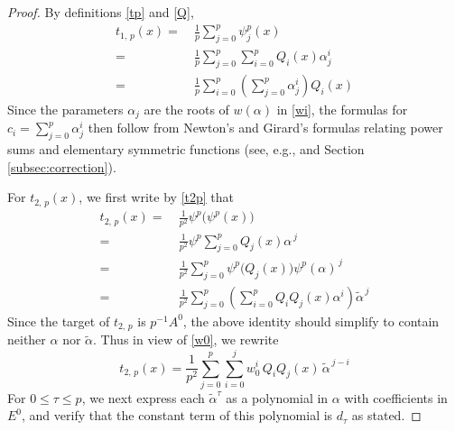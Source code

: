 \documentclass{gtpart}
\theoremstyle{definition}
\theoremstyle{remark}
\newcommand{\A}{\alpha}
\newcommand{\T}{\tau}
\renewcommand{\=}{\approx}
\renewcommand{\-}{\sim}
\numberwithin{equation}{section}
\begin{document}
\begin{proof}
 By definitions \eqref{tp} and \eqref{Q}, 
 \begin{equation*}
  \begin{split}
   t_{1,\,p}(x) = & ~ \frac{1}{p} \sum_{j = 0}^p \psi^p_j(x) \\
                = & ~ \frac{1}{p} \sum_{j = 0}^p \sum_{i = 0}^p Q_i(x) \A_j^i \\
                = & ~ \frac{1}{p} \sum_{i = 0}^p \left( \sum_{j = 0}^p 
                    \A_j^i \right) Q_i(x) 
  \end{split}
 \end{equation*}
 Since the parameters $\A_j$ are the roots of $w(\A)$ in \eqref{wi}, the 
 formulas for $c_i = \sum_{j=0}^p \A_j^i$ then follow from Newton's and Girard's 
 formulas relating power sums and elementary symmetric functions (see, e.g., 
 \cite[Problem 16-A]{cc} and Section \ref{subsec:correction}).  

 For $t_{2,\,p}(x)$, we first write by \eqref{t2p} that 
 \begin{equation*}
  \begin{split}
   t_{2,\,p}(x) = & ~ \frac{1}{p^2} \psi^p \big( \psi^p(x) \big) \\
                = & ~ \frac{1}{p^2} \psi^p \sum_{j = 0}^p Q_j(x) \A^{\,j} \\
                = & ~ \frac{1}{p^2} \sum_{j = 0}^p \psi^p \big( Q_j(x) \big) 
                  \psi^p(\A)^{\,j} \\
                = & ~ \frac{1}{p^2} \sum_{j = 0}^p \left( \sum_{i = 0}^p 
                  Q_i Q_j(x) \A^i \right) \widetilde{\A}^{\,j} 
  \end{split}
 \end{equation*}
 Since the target of $t_{2,\,p}$ is $p^{-1} A^0$, the above identity should 
 simplify to contain neither $\A$ nor $\widetilde{\A}$.  Thus in view of 
 \eqref{w0}, we rewrite 
 \[
  t_{2,\,p}(x) = \frac{1}{p^2} \sum_{j = 0}^p \sum_{i = 0}^j w_0^i \, Q_i Q_j(x) 
  \, \widetilde{\A}^{\,j - i} 
 \]
 For $0 \leq \T \leq p$, we next express each $\widetilde{\A}^\T$ as a 
 polynomial in $\A$ with coefficients in $E^0$, and verify that the constant 
 term of this polynomial is $d_\T$ as stated.  


\end{proof}
\end{document}
